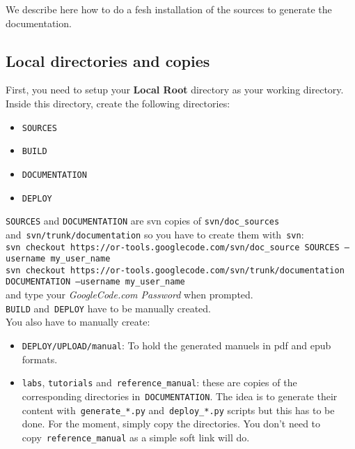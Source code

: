\documentclass[a4paper,10pt]{article}
\newcommand{\code}[1]{\texttt{#1}}
\begin{document}
We describe here how to do a fesh installation of the sources to generate the documentation.

\subsection{Local directories and copies}

First, you need to setup your {\bf Local Root} directory as your working directory. Inside this directory, create the following directories:
\begin{itemize}
\item \code{SOURCES}
\item \code{BUILD}
\item \code{DOCUMENTATION}
\item \code{DEPLOY}
\end{itemize}

\code{SOURCES} and \code{DOCUMENTATION} are svn copies of \code{svn/doc\_sources} and~\code{svn/trunk/documentation} so you have to create them with~\code{svn}:\\

\code{svn checkout https://or-tools.googlecode.com/svn/doc\_source SOURCES --username my\_user\_name}\\

\code{svn checkout https://or-tools.googlecode.com/svn/trunk/documentation DOCUMENTATION --username my\_user\_name}\\

and type your \emph{GoogleCode.com Password} when prompted.\\

\code{BUILD} and~\code{DEPLOY} have to be manually created.\\

You also have to manually create:

\begin{itemize}
\item \code{DEPLOY/UPLOAD/manual}: To hold the generated manuels in pdf and epub formats.
\item \code{labs}, \code{tutorials} and~\code{reference\_manual}: these are copies of the corresponding directories in~\code{DOCUMENTATION}. The idea is to generate their content with~\code{generate\_*.py} and~\code{deploy\_*.py} scripts but this has to be done. For the moment, simply copy the directories. You don't need to copy~\code{reference\_manual} as a simple soft link will do.
\end{itemize}
\end{document}
